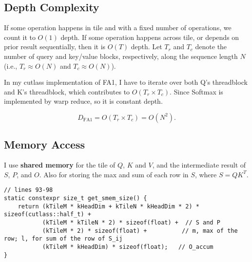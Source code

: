 \documentclass[11pt]{article}
\begin{document}
\subsection{Depth Complexity}

If some operation happens in tile and with a fixed number of operations, we count it to $O(1)$ depth. If some operation happens across tile, or depends on prior result sequentially, then it is $O(T)$ depth.
Let $T_r$ and $T_c$ denote the number of query and key/value blocks, respectively, along the sequence length $N$ 
(i.e., $T_r \approx O(N)$ and $T_c \approx O(N)$).

In my cutlass implementation of FA1, I have to iterate over both Q's threadblock and K's threadblock, which contributes to $O(T_r \times T_c)$. Since Softmax is implemented by warp reduce, so it is constant depth.

\[
D_{\text{FA1}} = O(T_r \times T_c) = O(N^2).
\]

\subsection{Memory Access}
\label{sec:mem-acc}

I use \textbf{shared memory} for the tile of $Q$, $K$ and $V$, and the intermediate result of $S$, $P$, and $O$. Also for storing the max and sum of each row in $S$, where $S=QK^T$.
\begin{lstlisting}
// lines 93-98
static constexpr size_t get_smem_size() {
    return (kTileM * kHeadDim + kTileN * kHeadDim * 2) * sizeof(cutlass::half_t) +
           (kTileM * kTileN * 2) * sizeof(float) +  // S and P
           (kTileM * 2) * sizeof(float) +          // m, max of the row; l, for sum of the row of S_ij
           (kTileM * kHeadDim) * sizeof(float);   // O_accum
}
\end{lstlisting}
\end{document}
